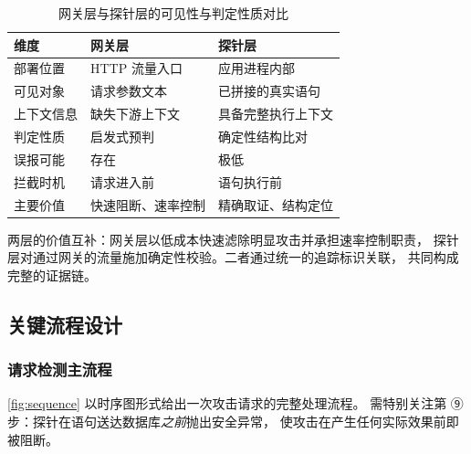 \begin{table}[htbp]
\centering
\caption{网关层与探针层的可见性与判定性质对比}
\label{tab:layer-comparison}
\small
\begin{tabular}{@{}l l l@{}}
\toprule
\textbf{维度} & \textbf{网关层} & \textbf{探针层} \\
\midrule
部署位置     & HTTP 流量入口     & 应用进程内部 \\
可见对象     & 请求参数文本      & 已拼接的真实语句 \\
上下文信息   & 缺失下游上下文    & 具备完整执行上下文 \\
判定性质     & 启发式预判        & 确定性结构比对 \\
误报可能     & 存在              & 极低 \\
拦截时机     & 请求进入前        & 语句执行前 \\
主要价值     & 快速阻断、速率控制 & 精确取证、结构定位 \\
\bottomrule
\end{tabular}
\end{table}

两层的价值互补：网关层以低成本快速滤除明显攻击并承担速率控制职责，
探针层对通过网关的流量施加确定性校验。二者通过统一的追踪标识关联，
共同构成完整的证据链。

\subsection{关键流程设计}

\subsubsection{请求检测主流程}

\cref{fig:sequence} 以时序图形式给出一次攻击请求的完整处理流程。
需特别关注第 ⑨ 步：探针在语句送达数据库\emph{之前}抛出安全异常，
使攻击在产生任何实际效果前即被阻断。

